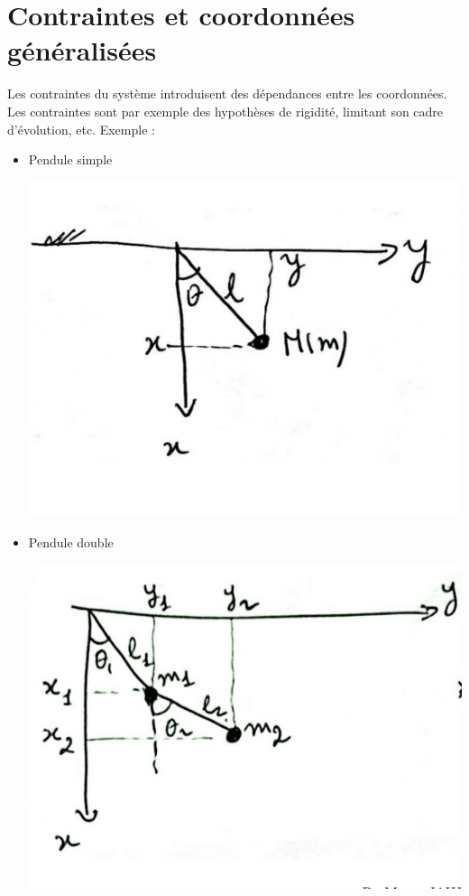 \documentclass[12pt,oneside]{book}
\begin{document}
\section{Contraintes et coordonnées généralisées}
Les contraintes du système introduisent des dépendances entre les coordonnées. Les contraintes sont par exemple des hypothèses de rigidité, limitant son cadre d'évolution, etc.
Exemple :
\begin{itemize}
    \item Pendule simple
    \begin{minipage}{0.49\linewidth}
        \includegraphics[width=\linewidth]{../pic/2204/pendulesimple.png}
    \end{minipage}
    \begin{minipage}{0.39\linewidth}
    \end{minipage}
    \item Pendule double
    \begin{minipage}{0.49\linewidth}
        \includegraphics[width=\linewidth]{../pic/2204/penduledouble.png}
    \end{minipage}
    \begin{minipage}{0.39\linewidth}
         \\
    \end{minipage}
\end{itemize}
\end{document}

